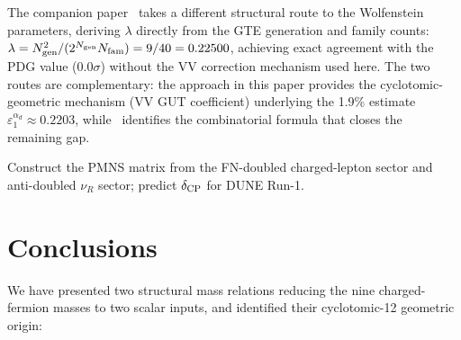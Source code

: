 \documentclass[11pt]{article}
\theoremstyle{remark}
\begin{document}
\begin{tcolorbox}[openbox,title=Open Problem 3 --- Full CKM + CP phase]
The companion paper~\cite{SpivackCKM} takes a different structural route to the Wolfenstein parameters, deriving $\lambda$ directly from the GTE generation and family counts: $\lambda = N_{\rm gen}^2 / (2^{N_{\rm gen}} N_{\rm fam}) = 9/40 = 0.22500$, achieving exact agreement with the PDG value ($0.0\sigma$) without the VV correction mechanism used here.  The two routes are complementary: the approach in this paper provides the cyclotomic-geometric mechanism (VV GUT coefficient) underlying the 1.9\% estimate $\varepsilon_1^{\alpha_d} \approx 0.2203$, while~\cite{SpivackCKM} identifies the combinatorial formula that closes the remaining gap.
\end{tcolorbox}

\begin{tcolorbox}[openbox,title=Open Problem 4 --- PMNS + $\delta_{\rm CP}$]
\label{op:nu}
Construct the PMNS matrix from the FN-doubled charged-lepton sector and
anti-doubled $\nu_R$ sector; predict $\delta_{\rm CP}$ for DUNE Run-1.
\end{tcolorbox}

\section{Conclusions}
\label{sec:conclusions}

We have presented two structural mass relations reducing the nine charged-fermion
masses to two scalar inputs, and identified their cyclotomic-12 geometric
origin:
\end{document}
